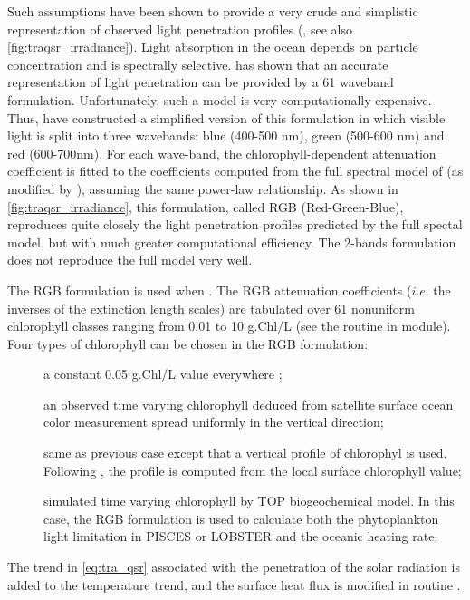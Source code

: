 \documentclass[../tex_main/NEMO_manual]{subfiles}
\begin{document}
Such assumptions have been shown to provide a very crude and simplistic representation of
observed light penetration profiles (\cite{Morel_JGR88}, see also \autoref{fig:traqsr_irradiance}).
Light absorption in the ocean depends on particle concentration and is spectrally selective.
\cite{Morel_JGR88} has shown that an accurate representation of light penetration can be provided by
a 61 waveband formulation.
Unfortunately, such a model is very computationally expensive.
Thus, \cite{Lengaigne_al_CD07} have constructed a simplified version of this formulation in which
visible light is split into three wavebands: blue (400-500 nm), green (500-600 nm) and red (600-700nm).
For each wave-band, the chlorophyll-dependent attenuation coefficient is fitted to the coefficients computed from
the full spectral model of \cite{Morel_JGR88} (as modified by \cite{Morel_Maritorena_JGR01}),
assuming the same power-law relationship.
As shown in \autoref{fig:traqsr_irradiance}, this formulation, called RGB (Red-Green-Blue),
reproduces quite closely the light penetration profiles predicted by the full spectal model,
but with much greater computational efficiency.
The 2-bands formulation does not reproduce the full model very well. 

The RGB formulation is used when .
The RGB attenuation coefficients ($i.e.$ the inverses of the extinction length scales) are tabulated over
61 nonuniform chlorophyll classes ranging from 0.01 to 10 g.Chl/L
(see the routine  in  module).
Four types of chlorophyll can be chosen in the RGB formulation:
\begin{description} 
\item[]
  a constant 0.05 g.Chl/L value everywhere ; 
\item[]
  an observed time varying chlorophyll deduced from satellite surface ocean color measurement spread uniformly in
  the vertical direction;
\item[]
  same as previous case except that a vertical profile of chlorophyl is used.
  Following \cite{Morel_Berthon_LO89}, the profile is computed from the local surface chlorophyll value;
\item[]
  simulated time varying chlorophyll by TOP biogeochemical model.
  In this case, the RGB formulation is used to calculate both the phytoplankton light limitation in
  PISCES or LOBSTER and the oceanic heating rate. 
\end{description} 
The trend in \autoref{eq:tra_qsr} associated with the penetration of the solar radiation is added to
the temperature trend, and the surface heat flux is modified in routine .
\end{document}
